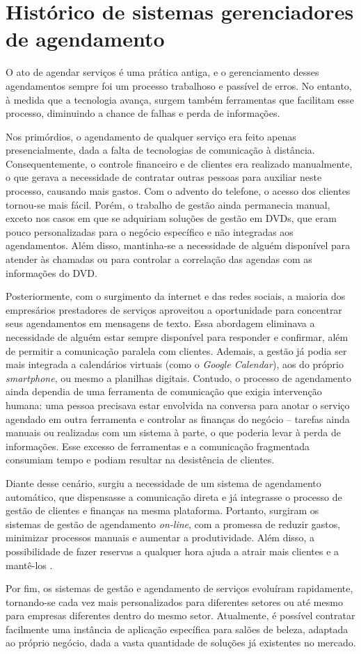 \section{Histórico de sistemas gerenciadores de agendamento}

O ato de agendar serviços é uma prática antiga, e o gerenciamento desses agendamentos sempre foi um processo trabalhoso e passível de erros. No entanto, à medida que a tecnologia avança, surgem também ferramentas que facilitam esse processo, diminuindo a chance de falhas e perda de informações.

Nos primórdios, o agendamento de qualquer serviço era feito apenas presencialmente, dada a falta de tecnologias de comunicação à distância. Consequentemente, o controle financeiro e de clientes era realizado manualmente, o que gerava a necessidade de contratar outras pessoas para auxiliar neste processo, causando mais gastos. Com o advento do telefone, o acesso dos clientes tornou-se mais fácil. Porém, o trabalho de gestão ainda permanecia manual, exceto nos casos em que se adquiriam soluções de gestão em DVDs, que eram pouco personalizadas para o negócio específico e não integradas aos agendamentos. Além disso, mantinha-se a necessidade de alguém disponível para atender às chamadas ou para controlar a correlação das agendas com as informações do DVD.

Posteriormente, com o surgimento da internet e das redes sociais, a maioria dos empresários prestadores de serviços aproveitou a oportunidade para concentrar seus agendamentos em mensagens de texto. Essa abordagem eliminava a necessidade de alguém estar sempre disponível para responder e confirmar, além de permitir a comunicação paralela com clientes. Ademais, a gestão já podia ser mais integrada a calendários virtuais (como o \emph{Google Calendar}), aos do próprio \emph{smartphone}, ou mesmo a planilhas digitais. Contudo, o processo de agendamento ainda dependia de uma ferramenta de comunicação que exigia intervenção humana: uma pessoa precisava estar envolvida na conversa para anotar o serviço agendado em outra ferramenta e controlar as finanças do negócio – tarefas ainda manuais ou realizadas com um sistema à parte, o que poderia levar à perda de informações. Esse excesso de ferramentas e a comunicação fragmentada consumiam tempo e podiam resultar na desistência de clientes.

Diante desse cenário, surgiu a necessidade de um sistema de agendamento automático, que dispensasse a comunicação direta e já integrasse o processo de gestão de clientes e finanças na mesma plataforma. Portanto, surgiram os sistemas de gestão de agendamento \emph{on-line}, com a promessa de reduzir gastos, minimizar processos manuais e aumentar a produtividade. Além disso, a possibilidade de fazer reservas a qualquer hora ajuda a atrair mais clientes e a mantê-los \cite{reservio}.

Por fim, os sistemas de gestão e agendamento de serviços evoluíram rapidamente, tornando-se cada vez mais personalizados para diferentes setores ou até mesmo para empresas diferentes dentro do mesmo setor. Atualmente, é possível contratar facilmente uma instância de aplicação específica para salões de beleza, adaptada ao próprio negócio, dada a vasta quantidade de soluções já existentes no mercado.